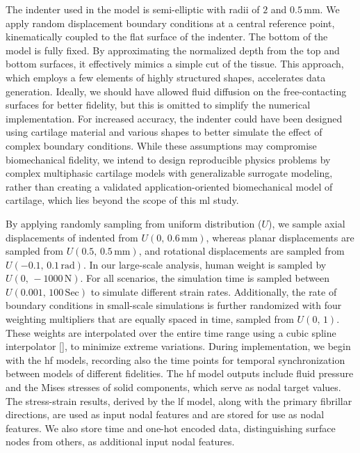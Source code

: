 \documentclass[12pt,a4paper]{report}
\begin{document}
The indenter used in the model is semi-elliptic with radii of $2$ and $0.5 \, \text{mm}$. We apply random displacement boundary conditions at a central reference point, kinematically coupled to the flat surface of the indenter. The bottom of the model is fully fixed. By approximating the normalized depth from the top and bottom surfaces, it effectively mimics a simple cut of the tissue. This approach, which employs a few elements of highly structured shapes, accelerates data generation. Ideally, we should have allowed fluid diffusion on the free-contacting surfaces for better fidelity, but this is omitted to simplify the numerical implementation. For increased accuracy, the indenter could have been designed using cartilage material and various shapes to better simulate the effect of complex boundary conditions. While these assumptions may compromise biomechanical fidelity, we intend to design reproducible physics problems by complex multiphasic cartilage models with generalizable surrogate modeling, rather than creating a validated application-oriented biomechanical model of cartilage, which lies beyond the scope of this \ac{ml} study.

By applying randomly sampling from uniform distribution ($U$), we sample axial displacements of indented from $U(0, \, 0.6\,\text{mm})$, whereas planar displacements are sampled from $U(0.5, \, 0.5\,\text{mm})$, and rotational displacements are sampled from $U(-0.1, \, 0.1\,\text{rad})$. In our large-scale analysis, human weight is sampled by $U(0, \, -1000\,\text{N})$. For all scenarios, the simulation time is sampled between $U(0.001, \, 100\,\text{Sec})$ to simulate different strain rates. Additionally, the rate of boundary conditions in small-scale simulations is further randomized with four weighting multipliers that are equally spaced in time, sampled from $U(0, \, 1)$. These weights are interpolated over the entire time range using a cubic spline interpolator [\cite{de_boor1978}], to minimize extreme variations. During implementation, we begin with the \ac{hf} models, recording also the time points for temporal synchronization between models of different fidelities. The \ac{hf} model outputs include fluid pressure and the Mises stresses of solid components, which serve as nodal target values. The stress-strain results, derived by the \ac{lf} model, along with the primary fibrillar directions, are used as input nodal features and are stored for use as nodal features. We also store time and one-hot encoded data, distinguishing surface nodes from others, as additional input nodal features.
\end{document}
